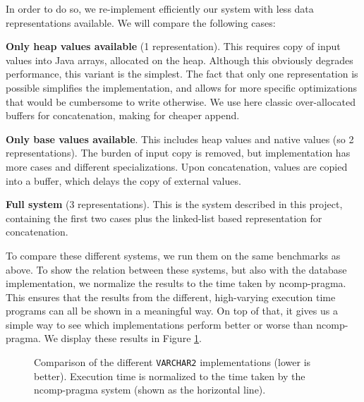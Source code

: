 \documentclass[twoside,11pt,a4paper]{article}
\newcommand{\pls}[1]{\small\texttt{#1}\normalsize}
\newcommand{\plstype}[1]{\pls{#1}}
\newcommand{\varchar}{\plstype{VARCHAR2}}
\newcommand{\benchsystem}[1]{\textsf{#1}}
\newcommand{\ncpg}{\benchsystem{ncomp-pragma}}
\begin{document}
In order to do so, we re-implement efficiently our system with less data representations available. We will compare the following cases:

\textbf{Only heap values available} (1 representation). This requires copy of input values into Java arrays, allocated on the heap. Although this obviously degrades performance, this variant is the simplest. The fact that only one representation is possible simplifies the implementation, and allows for more specific optimizations that would be cumbersome to write otherwise. We use here classic over-allocated buffers for concatenation, making for cheaper append.

\textbf{Only base values available}. This includes heap values and native values (so 2 representations). The burden of input copy is removed, but implementation has more cases and different specializations. Upon concatenation, values are copied into a buffer, which delays the copy of external values.

\textbf{Full system} (3 representations). This is the system described in this project, containing the first two cases plus the linked-list based representation for concatenation.

To compare these different systems, we run them on the same benchmarks as above. To show the relation between these systems, but also with the database implementation, we normalize the results to the time taken by \ncpg{}. This ensures that the results from the different, high-varying execution time programs can all be shown in a meaningful way. On top of that, it gives us a simple way to see which implementations perform better or worse than \ncpg{}. We display these results in Figure \ref{fig:exp3c}.

\begin{figure}[tp]
	\centering
	\caption[Comparison of the different \varchar{} implementations]{Comparison of the different \varchar{} implementations (lower is better). Execution time is normalized to the time taken by the \ncpg{} system (shown as the horizontal line).}
	\label{fig:exp3c}
\end{figure}
\end{document}
